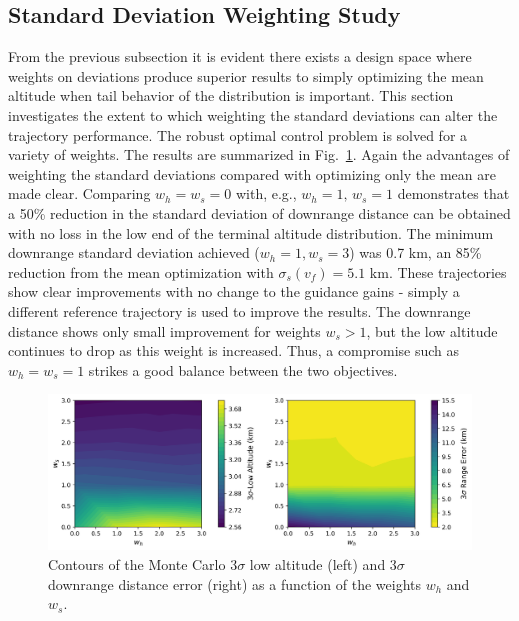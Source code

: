 \documentclass[journal ]{new-aiaa}
\begin{document}
\subsection*{Standard Deviation Weighting Study}
From the previous subsection it is evident there exists a design space where weights on deviations produce superior results to simply optimizing the mean altitude when tail behavior of the distribution is important. This section investigates the extent to which weighting the standard deviations can alter the trajectory performance. The robust optimal control problem is solved for a variety of weights. The results are summarized in Fig.~\ref{fig_weight_sweep}. Again the advantages of weighting the standard deviations compared with optimizing only the mean are made clear. Comparing $w_h=w_s=0$ with, e.g., $w_h=1,\,w_s = 1$ demonstrates that a 50\% reduction in the standard deviation of downrange distance can be obtained with no loss in the low end of the terminal altitude distribution. The minimum downrange standard deviation achieved ($w_h=1,w_s=3$) was 0.7 km, an 85\% reduction from the mean optimization with $\sigma_s(v_f)=5.1$ km. These trajectories show clear improvements with no change to the guidance gains - simply a different reference trajectory is used to improve the results. The downrange distance shows only small improvement for weights $w_s>1$, but the low altitude continues to drop as this weight is increased. Thus, a compromise such as $w_h=w_s=1$ strikes a good balance between the two objectives. 
\begin{figure}[h!]
	\centering
	\includegraphics[width=1\textwidth]{ddp/python/Heavy_WeightSweepMCResults}
	\caption{Contours of the Monte Carlo 3$\sigma$ low altitude (left) and 3$\sigma$ downrange distance error (right) as a function of the weights $w_h$ and $w_s$.}
	\label{fig_weight_sweep}
\end{figure}
\end{document}
